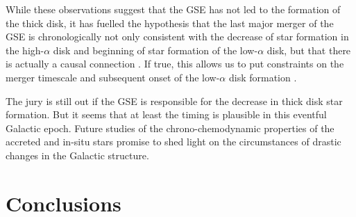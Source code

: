 \documentclass[fleqn,usenatbib]{mnras}
\begin{document}
While these observations suggest that the GSE has not led to the formation of the thick disk, it has fuelled the hypothesis that the last major merger of the GSE is chronologically not only consistent with the decrease of star formation in the high-$\alpha$ disk \citep{Bonaca2020} and beginning of star formation of the low-$\alpha$ disk, but that there is actually a causal connection \citep[see e.g.][]{Buck2020}. If true, this allows us to put constraints on the merger timescale and subsequent onset of the low-$\alpha$ disk formation \citep[e.g.][]{DiMatteo2019,Belokurov2020}.

The jury is still out if the GSE is responsible for the decrease in thick disk star formation. But it seems that at least the timing is plausible in this eventful Galactic epoch. Future studies of the chrono-chemodynamic properties of the accreted and in-situ stars promise to shed light on the circumstances of drastic changes in the Galactic structure.

\section{Conclusions} \label{sec:conclusions}
\end{document}
